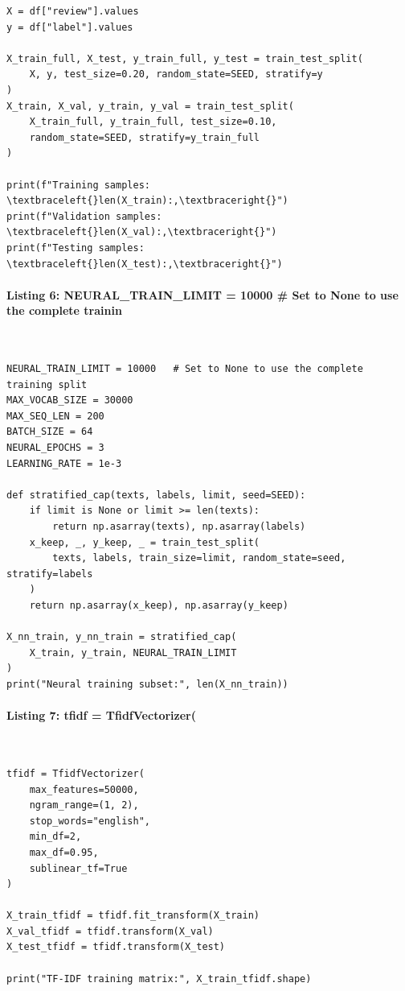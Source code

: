 \documentclass[12pt,a4paper,oneside]{report}
\begin{document}
\begin{Verbatim}[commandchars=\\\{\},breaklines=true,breakanywhere=true,fontsize=\scriptsize,frame=leftline,framesep=2mm,rulecolor=\color{gray}]
X = df["review"].values
y = df["label"].values

X_train_full, X_test, y_train_full, y_test = train_test_split(
    X, y, test_size=0.20, random_state=SEED, stratify=y
)
X_train, X_val, y_train, y_val = train_test_split(
    X_train_full, y_train_full, test_size=0.10,
    random_state=SEED, stratify=y_train_full
)

print(f"Training samples:   \textbraceleft{}len(X_train):,\textbraceright{}")
print(f"Validation samples: \textbraceleft{}len(X_val):,\textbraceright{}")
print(f"Testing samples:    \textbraceleft{}len(X_test):,\textbraceright{}")
\end{Verbatim}
\paragraph{Listing 6: NEURAL\_TRAIN\_LIMIT = 10000   \# Set to None to use the complete trainin}\mbox{}\\[-1ex]
\begin{Verbatim}[commandchars=\\\{\},breaklines=true,breakanywhere=true,fontsize=\scriptsize,frame=leftline,framesep=2mm,rulecolor=\color{gray}]
NEURAL_TRAIN_LIMIT = 10000   # Set to None to use the complete training split
MAX_VOCAB_SIZE = 30000
MAX_SEQ_LEN = 200
BATCH_SIZE = 64
NEURAL_EPOCHS = 3
LEARNING_RATE = 1e-3

def stratified_cap(texts, labels, limit, seed=SEED):
    if limit is None or limit >= len(texts):
        return np.asarray(texts), np.asarray(labels)
    x_keep, _, y_keep, _ = train_test_split(
        texts, labels, train_size=limit, random_state=seed, stratify=labels
    )
    return np.asarray(x_keep), np.asarray(y_keep)

X_nn_train, y_nn_train = stratified_cap(
    X_train, y_train, NEURAL_TRAIN_LIMIT
)
print("Neural training subset:", len(X_nn_train))
\end{Verbatim}
\paragraph{Listing 7: tfidf = TfidfVectorizer(}\mbox{}\\[-1ex]
\begin{Verbatim}[commandchars=\\\{\},breaklines=true,breakanywhere=true,fontsize=\scriptsize,frame=leftline,framesep=2mm,rulecolor=\color{gray}]
tfidf = TfidfVectorizer(
    max_features=50000,
    ngram_range=(1, 2),
    stop_words="english",
    min_df=2,
    max_df=0.95,
    sublinear_tf=True
)

X_train_tfidf = tfidf.fit_transform(X_train)
X_val_tfidf = tfidf.transform(X_val)
X_test_tfidf = tfidf.transform(X_test)

print("TF-IDF training matrix:", X_train_tfidf.shape)
\end{Verbatim}
\end{document}
